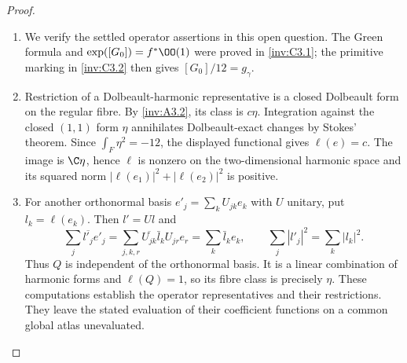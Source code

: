 \begin{proof}
\begin{enumerate}[label=\arabic*.,leftmargin=*]
\item We verify the settled operator assertions in this open question.
The Green formula and $\exp([G_0])=f^*\OO(1)$ were proved in
\ref{inv:C3.1}; the primitive marking in \ref{inv:C3.2} then gives
$[G_0]/12=g_\gamma$.

\item Restriction of a Dolbeault-harmonic representative is a closed
Dolbeault form on the regular fibre. By \ref{inv:A3.2}, its class
is $c\eta$. Integration against the closed $(1,1)$ form $\eta$
annihilates Dolbeault-exact changes by Stokes' theorem. Since
$\int_F\eta^2=-12$, the displayed functional gives $\ell(e)=c$.
The image is $\C\eta$, hence $\ell$ is nonzero on the
 two-dimensional harmonic space and its squared norm
$|\ell(e_1)|^2+|\ell(e_2)|^2$ is positive.

\item For another orthonormal basis $e'_j=\sum_k U_{jk}e_k$ with
$U$ unitary, put $l_k=\ell(e_k)$. Then $l'=Ul$ and
\[
 \sum_j\overline{l'_j}e'_j
 =\sum_{j,k,r}\overline{U_{jk}}\bar l_k U_{jr}e_r
 =\sum_k\bar l_ke_k,
 \qquad \sum_j|l'_j|^2=\sum_k|l_k|^2.
\]
Thus $Q$ is independent of the orthonormal basis. It is a linear
combination of harmonic forms and $\ell(Q)=1$, so its fibre class
is precisely $\eta$. These computations establish the operator
representatives and their restrictions. They leave the stated
evaluation of their coefficient functions on a common global
atlas unevaluated.
\end{enumerate}
\end{proof}


